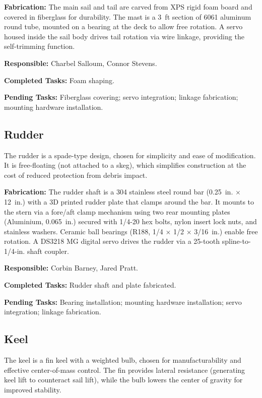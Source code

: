 \textbf{Fabrication:} The main sail and tail are carved from XPS rigid foam board and covered in fiberglass for durability. The mast is a 3~ft section of 6061 aluminum round tube, mounted on a bearing at the deck to allow free rotation. A servo housed inside the sail body drives tail rotation via wire linkage, providing the self-trimming function.

\textbf{Responsible:} Charbel Salloum, Connor Stevens.

\textbf{Completed Tasks:} Foam shaping.

\textbf{Pending Tasks:} Fiberglass covering; servo integration; linkage fabrication; mounting hardware installation.


\subsection{Rudder}

The rudder is a spade-type design, chosen for simplicity and ease of modification. It is free-floating (not attached to a skeg), which simplifies construction at the cost of reduced protection from debris impact.

\textbf{Fabrication:} The rudder shaft is a 304 stainless steel round bar (0.25~in. $\times$ 12~in.) with a 3D printed rudder plate that clamps around the bar. It mounts to the stern via a fore/aft clamp mechanism using two rear mounting plates (Aluminium, 0.065~in.) secured with 1/4-20 hex bolts, nylon insert lock nuts, and stainless washers. Ceramic ball bearings (R188, 1/4 $\times$ 1/2 $\times$ 3/16~in.) enable free rotation. A DS3218 MG digital servo drives the rudder via a 25-tooth spline-to-1/4-in. shaft coupler.

\textbf{Responsible:} Corbin Barney, Jared Pratt.

\textbf{Completed Tasks:} Rudder shaft and plate fabricated.

\textbf{Pending Tasks:} Bearing installation; mounting hardware installation; servo integration; linkage fabrication.


\subsection{Keel}

The keel is a fin keel with a weighted bulb, chosen for manufacturability and effective center-of-mass control. The fin provides lateral resistance (generating keel lift to counteract sail lift), while the bulb lowers the center of gravity for improved stability.

